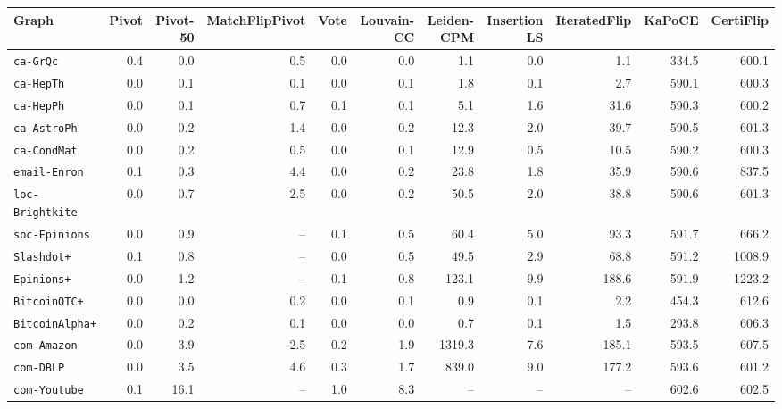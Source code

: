 \begin{tabular}{lrrrrrrrrrr}
\toprule
Graph & Pivot & Pivot-50 & MatchFlipPivot & Vote & Louvain-CC & Leiden-CPM & Insertion LS & IteratedFlip & KaPoCE & CertiFlip\\
\midrule
\texttt{ca-GrQc} & 0.4 & 0.0 & 0.5 & 0.0 & 0.0 & 1.1 & 0.0 & 1.1 & 334.5 & 600.1\\
\texttt{ca-HepTh} & 0.0 & 0.1 & 0.1 & 0.0 & 0.1 & 1.8 & 0.1 & 2.7 & 590.1 & 600.3\\
\texttt{ca-HepPh} & 0.0 & 0.1 & 0.7 & 0.1 & 0.1 & 5.1 & 1.6 & 31.6 & 590.3 & 600.2\\
\texttt{ca-AstroPh} & 0.0 & 0.2 & 1.4 & 0.0 & 0.2 & 12.3 & 2.0 & 39.7 & 590.5 & 601.3\\
\texttt{ca-CondMat} & 0.0 & 0.2 & 0.5 & 0.0 & 0.1 & 12.9 & 0.5 & 10.5 & 590.2 & 600.3\\
\texttt{email-Enron} & 0.1 & 0.3 & 4.4 & 0.0 & 0.2 & 23.8 & 1.8 & 35.9 & 590.6 & 837.5\\
\texttt{loc-Brightkite} & 0.0 & 0.7 & 2.5 & 0.0 & 0.2 & 50.5 & 2.0 & 38.8 & 590.6 & 601.3\\
\texttt{soc-Epinions} & 0.0 & 0.9 & -- & 0.1 & 0.5 & 60.4 & 5.0 & 93.3 & 591.7 & 666.2\\
\texttt{Slashdot+} & 0.1 & 0.8 & -- & 0.0 & 0.5 & 49.5 & 2.9 & 68.8 & 591.2 & 1008.9\\
\texttt{Epinions+} & 0.0 & 1.2 & -- & 0.1 & 0.8 & 123.1 & 9.9 & 188.6 & 591.9 & 1223.2\\
\texttt{BitcoinOTC+} & 0.0 & 0.0 & 0.2 & 0.0 & 0.1 & 0.9 & 0.1 & 2.2 & 454.3 & 612.6\\
\texttt{BitcoinAlpha+} & 0.0 & 0.2 & 0.1 & 0.0 & 0.0 & 0.7 & 0.1 & 1.5 & 293.8 & 606.3\\
\texttt{com-Amazon} & 0.0 & 3.9 & 2.5 & 0.2 & 1.9 & 1319.3 & 7.6 & 185.1 & 593.5 & 607.5\\
\texttt{com-DBLP} & 0.0 & 3.5 & 4.6 & 0.3 & 1.7 & 839.0 & 9.0 & 177.2 & 593.6 & 601.2\\
\texttt{com-Youtube} & 0.1 & 16.1 & -- & 1.0 & 8.3 & -- & -- & -- & 602.6 & 602.5\\
\bottomrule
\end{tabular}
